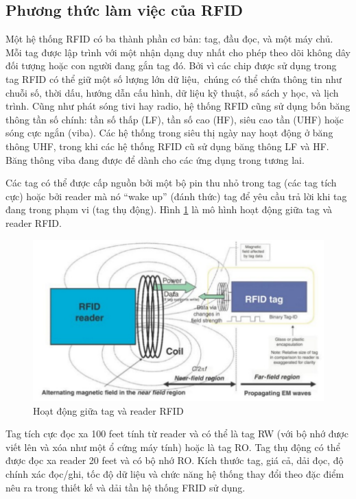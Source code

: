 \subsection{Phương thức làm việc của RFID}
Một hệ thống RFID có ba thành phần cơ bản: tag, đầu đọc, và một máy chủ.
Mỗi tag được lập trình với một nhận dạng duy nhất cho phép theo dõi không dây đối tượng hoặc con người đang gắn tag đó.
Bởi vì các chip được sử dụng trong tag RFID có thể giữ một số lượng lớn dữ liệu,\
chúng có thể chứa thông tin như chuỗi số, thời dấu, hướng dẫn cấu hình, dữ liệu kỹ thuật, sổ sách y học, và lịch trình.
Cũng như phát sóng tivi hay radio, hệ thống RFID cũng sử dụng bốn băng thông tần số chính:
tần số thấp (LF), tần số cao (HF), siêu cao tần (UHF) hoặc sóng cực ngắn (viba).
Các hệ thống trong siêu thị ngày nay hoạt động ở băng thông UHF,
trong khi các hệ thống RFID cũ sử dụng băng thông LF và HF.
Băng thông viba đang được để dành cho các ứng dụng trong tương lai.

Các tag có thể được cấp nguồn bởi một bộ pin thu nhỏ trong tag (các tag tích cực)
hoặc bởi reader mà nó ``wake up'' (đánh thức) tag để yêu cầu trả lời khi tag đang trong phạm vi (tag thụ động).
Hình \ref{fig:tag_reader_workflow} là mô hình hoạt động giữa tag và reader RFID.
\begin{figure}[ht]
\centering
\includegraphics[scale=0.5]{images/tag_reader_workflow.png}
\caption{Hoạt động giữa tag và reader RFID}
\label{fig:tag_reader_workflow}
\end{figure}

Tag tích cực đọc xa 100 feet tính từ reader và có thể là tag RW (với bộ nhớ được viết lên và xóa như một ổ cứng máy tính) hoặc là tag RO.
Tag thụ động có thể được đọc xa reader 20 feet và có bộ nhớ RO.
Kích thước tag, giá cả, dải đọc, độ chính xác đọc/ghi, tốc độ dữ liệu và chức năng hệ thống thay đổi theo đặc điểm nêu ra trong thiết kế và dải tần hệ thống FRID sử dụng.

